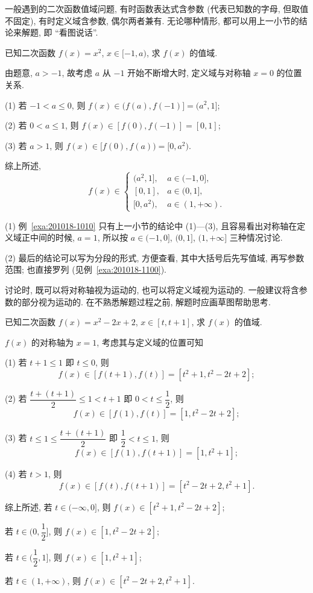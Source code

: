一般遇到的二次函数值域问题, 有时函数表达式含参数 (代表已知数的字母, 但取值不固定), 有时定义域含参数, 偶尔两者兼有. 无论哪种情形, 都可以用上一小节的结论来解题, 即 ``看图说话''.

\begin{example}\label{exa:201018-1010}
  已知二次函数 $f(x)=x^2$, $x\in[-1,a)$, 求 $f(x)$ 的值域.
\end{example}
\begin{solution}
  由题意, $a>-1$, 故考虑 $a$ 从 $-1$ 开始不断增大时, 定义域与对称轴 $x=0$ 的位置关系.
  
  (1) 若 $-1<a\leqslant 0$, 则 $f(x)\in(f(a),f(-1)]= (a^2,1]$;
  
  (2) 若 $0<a\leqslant 1$, 则 $f(x)\in[f(0),f(-1)]= [0,1]$;
  
  (3) 若 $a> 1$, 则 $f(x)\in[f(0),f(a))= [0,a^2)$.
  
  综上所述,
  \[f(x)\in\begin{cases}
    (a^2,1], & a\in(-1,0],\\
    [0,1],   & a\in(0,1],\\
    [0,a^2), & a\in(1,+\infty).
    \end{cases}\]
\end{solution}
\begin{remark}
  (1) 例~\ref{exa:201018-1010} 只有上一小节的结论中 (1)---(3), 且容易看出对称轴在定义域正中间的时候, $a=1$, 所以按 $a\in(-1,0]$, $(0,1]$, $(1,+\infty]$ 三种情况讨论.
  
  (2) 最后的结论可以写为分段的形式, 方便查看, 其中大括号后先写值域, 再写参数范围; 也直接罗列 (见例~\ref{exa:201018-1100}).
\end{remark}

讨论时, 既可以将对称轴视为运动的, 也可以将定义域视为运动的. 一般建议将含参数的部分视为运动的. 在不熟悉解题过程之前, 解题时应画草图帮助思考.

\begin{example}\label{exa:201018-1100}
  已知二次函数 $f(x)=x^2-2x+2$, $x\in[t,t+1]$, 求 $f(x)$ 的值域.
\end{example}
\begin{solution}
  $f(x)$ 的对称轴为 $x=1$, 考虑其与定义域的位置可知
  
  (1) 若 $t+1\leqslant 1$ 即 $t\leqslant 0$, 则 
  \[f(x)\in[f(t+1),f(t)]= [t^2+1,t^2-2t+2];\]
  
  (2) 若 $\dfrac{t+(t+1)}2\leqslant 1< t+1$ 即 $0< t\leqslant \dfrac12$, 则 
  \[f(x)\in[f(1),f(t)]= [1,t^2-2t+2];\]
  
  (3) 若 $t\leqslant 1\leqslant \dfrac{t+(t+1)}2$ 即 $\dfrac12< t\leqslant 1$, 则 
  \[f(x)\in[f(1),f(t+1)]= [1,t^2+1];\]
  
  (4) 若 $t> 1$, 则 
  \[f(x)\in[f(t),f(t+1)]= [t^2-2t+2,t^2+1].\]
  
  综上所述, 若 $t\in(-\infty,0]$, 则 $f(x)\in[t^2+1,t^2-2t+2]$; 
  
  若 $t\in\biggr(0,\dfrac12\biggr]$, 则 $f(x)\in[1,t^2-2t+2]$;
  
  若 $t\in\biggr(\dfrac12,1\biggr]$, 则 $f(x)\in[1,t^2+1]$; 
  
  若 $t\in (1,+\infty)$, 则 $f(x)\in[t^2-2t+2,t^2+1]$.
\end{solution}

